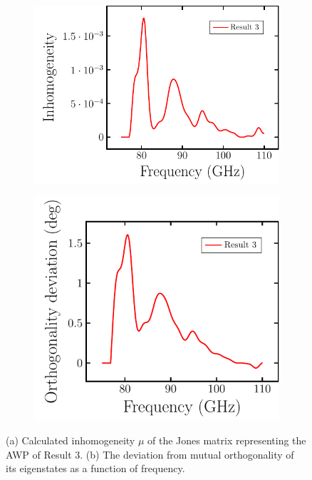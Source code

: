 \begin{figure}[H]
    \begin{subfigure}[b]{.5\linewidth}
    \caption{}\label{}
    \centering\includegraphics[scale=0.7]{images/results/plots/polymer/inhomogeneity_orthogonality_a.pdf}
    \end{subfigure}%
    \begin{subfigure}[b]{.5\linewidth}
    \caption{}\label{}
    \centering\includegraphics[scale=0.7]{images/results/plots/polymer/inhomogeneity_orthogonality_b.pdf}
    \end{subfigure}
    \caption{(a) Calculated inhomogeneity $\mu$ of the Jones matrix representing the AWP of Result 3. (b) The deviation from mutual orthogonality of its eigenstates as a function of frequency.}
    \label{fig:inhomogeneity_orthogonality}
\end{figure}

